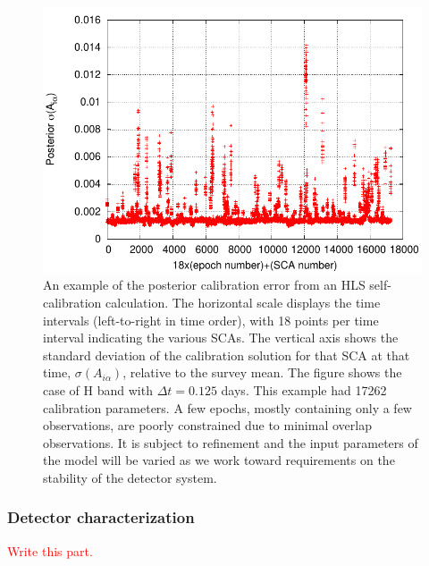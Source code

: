 \begin{figure}
\includegraphics[width=4.5in]{Plots/hcalfig.pdf}
\caption{\label{fig:hcalfig}An example of the posterior calibration error from an HLS self-calibration calculation. The horizontal scale displays the time intervals (left-to-right in time order), with 18 points per time interval indicating the various SCAs. The vertical axis shows the standard deviation of the calibration solution for that SCA at that time, $\sigma(A_{i\alpha})$, relative to the survey mean. The figure shows the case of H band with $\Delta t = 0.125$ days. This example had 17262 calibration parameters. A few epochs, mostly containing only a few observations, are poorly constrained due to minimal overlap observations. It is subject to refinement and the input parameters of the model will be varied as we work toward requirements on the stability of the detector system.}
\end{figure}

\subsubsection{Detector characterization}

\textcolor{red}{Write this part.}


